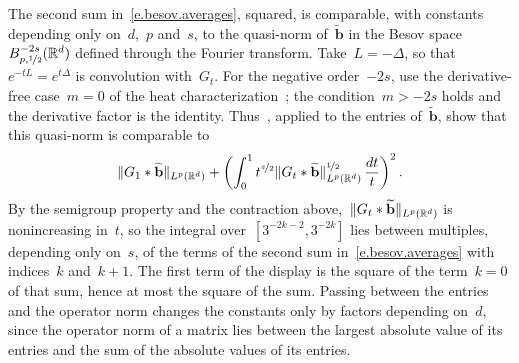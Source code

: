 \documentclass[11pt,letterpaper]{article}
\numberwithin{equation}{section}
\theoremstyle{definition}
\newcommand{\Rd}{\mathbb{R}^d}
\newcommand{\nf}{\nicefrac}
\DeclarePairedDelimiter{\norm}{\lVert}{\rVert}
\begin{document}
The second sum in~\eqref{e.besov.averages}, squared, is comparable, with constants depending only on~$d$,~$p$ and~$s$, to the quasi-norm of~$\widetilde{\mathbf b}$ in the Besov space~$B^{-2s}_{p,\nf12}(\Rd)$ defined through the Fourier transform. Take~$L=-\Delta$, so that~$e^{-tL}=e^{t\Delta}$ is convolution with~$G_t$. For the negative order~$-2s$, use the derivative-free case~$m=0$ of the heat characterization~\cite[Definition~6.6]{Kerkyacharian.Petrushev}; the condition~$m>-2s$ holds and the derivative factor is the identity. Thus~\cite[Definition~6.1(i) and Theorem~6.7(a)]{Kerkyacharian.Petrushev}, applied to the entries of~$\widetilde{\mathbf b}$, show that this quasi-norm is comparable to
\begin{equation*}
	\norm{G_1*\widetilde{\mathbf b}}_{L^p(\Rd)}+\biggl(\int_0^1t^{\nf s2}\norm{G_t*\widetilde{\mathbf b}}_{L^p(\Rd)}^{\nf12}\,\frac{dt}{t}\biggr)^2\,.
\end{equation*}
By the semigroup property and the contraction above,~$\norm{G_t*\widetilde{\mathbf b}}_{L^p(\Rd)}$ is nonincreasing in~$t$, so the integral over~$[3^{-2k-2},3^{-2k}]$ lies between multiples, depending only on~$s$, of the terms of the second sum in~\eqref{e.besov.averages} with indices~$k$ and~$k+1$. The first term of the display is the square of the term~$k=0$ of that sum, hence at most the square of the sum. Passing between the entries and the operator norm changes the constants only by factors depending on~$d$, since the operator norm of a matrix lies between the largest absolute value of its entries and the sum of the absolute values of its entries.
\end{document}
